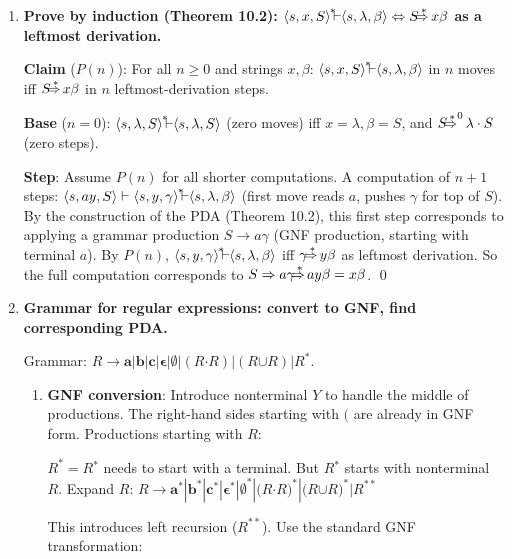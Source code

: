 \begin{enumerate}[{10.}1. ]
\item \textbf{Prove by induction (Theorem 10.2): $\langle s,x,S\rangle\Dvdash\langle s,\lambda,\beta\rangle \Leftrightarrow S\DRightarrow x\beta$ as a leftmost derivation.}

\textbf{Claim} ($P(n)$): For all $n\geq 0$ and strings $x,\beta$: $\langle s,x,S\rangle\Dvdash\langle s,\lambda,\beta\rangle$ in $n$ moves iff $S\DRightarrow x\beta$ in $n$ leftmost-derivation steps.

\textbf{Base} ($n=0$): $\langle s,\lambda,S\rangle\Dvdash\langle s,\lambda,S\rangle$ (zero moves) iff $x=\lambda, \beta=S$, and $S\DRightarrow^0 \lambda\cdot S$ (zero steps). \checkmark

\textbf{Step}: Assume $P(n)$ for all shorter computations. A computation of $n+1$ steps:
$\langle s,ay,S\rangle\vdash\langle s,y,\gamma\rangle\Dvdash\langle s,\lambda,\beta\rangle$ (first move reads $a$, pushes $\gamma$ for top of $S$).
By the construction of the PDA (Theorem 10.2), this first step corresponds to applying a grammar production $S \to a\gamma$ (GNF production, starting with terminal $a$). By $P(n)$, $\langle s,y,\gamma\rangle\Dvdash\langle s,\lambda,\beta\rangle$ iff $\gamma\DRightarrow y\beta$ as leftmost derivation.
So the full computation corresponds to $S \Rightarrow a\gamma \DRightarrow ay\beta = x\beta$. \qed

\item \textbf{Grammar for regular expressions: convert to GNF, find corresponding PDA.}

Grammar: $R \to \pmb{a}|\pmb{b}|\pmb{c}|\pmb{\epsilon}|\pmb{\emptyset}|(R\pmb{\cdot}R)|(R\pmb{\cup}R)|R^{\pmb{*}}$.

\begin{enumerate}
\item \textbf{GNF conversion}: Introduce nonterminal $Y$ to handle the middle of productions. The right-hand sides starting with $\pmb{(}$ are already in GNF form. Productions starting with $R$:

$R^{\pmb{*}} = R\pmb{^*}$ needs to start with a terminal. But $R\pmb{^*}$ starts with nonterminal $R$. Expand $R$:
$R \to \pmb{a}^{\pmb{*}}|\pmb{b}^{\pmb{*}}|\pmb{c}^{\pmb{*}}|\pmb{\epsilon}^{\pmb{*}}|\pmb{\emptyset}^{\pmb{*}}|\pmb{(}R\pmb{\cdot}R\pmb{)}^{\pmb{*}}|\pmb{(}R\pmb{\cup}R\pmb{)}^{\pmb{*}}|R^{\pmb{**}}$

This introduces left recursion ($R^{\pmb{**}}$). Use the standard GNF transformation:


\end{enumerate}
\end{enumerate}
